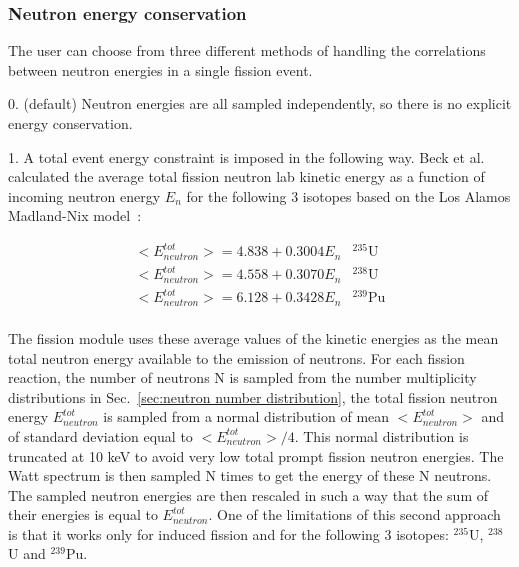 \subsubsection*{Neutron energy conservation}

The user can choose from three different methods of handling the
correlations between neutron energies in a single fission event.

\begin{list}{}
\item 0.  (default) Neutron 
energies are all sampled independently, so there is no explicit 
energy conservation.
\item 1.  A total event 
energy constraint is imposed in the following way. Beck et 
al.~\cite{Beck 2007} calculated the average total fission neutron 
lab kinetic energy as a function of incoming neutron energy $E_n$ 
for the following 3 isotopes based on the Los Alamos Madland-Nix 
model~\cite{Madland 1982}:


\begin{equation}
\begin{array}{ll}
<E^{tot}_{neutron}> = 4.838+0.3004E_n & ^{235}\mathrm{U}\\
<E^{tot}_{neutron}> = 4.558+0.3070E_n & ^{238}\mathrm{U}\\
<E^{tot}_{neutron}> = 6.128+0.3428E_n & ^{239}\mathrm{Pu}\\
\end{array}
\label{eq:Beck's expressions for the energy-dependent average outgoing prompt
fission neutron energy}
\end{equation}

The fission module uses these average values of the kinetic 
energies as the mean total neutron energy available to the 
emission of neutrons. For each fission reaction, the number 
of neutrons N is sampled from the number multiplicity 
distributions in Sec.~\ref{sec:neutron number 
distribution}, the total fission neutron energy 
$E^{tot}_{neutron}$ is sampled from a normal distribution 
of mean $<E^{tot}_{neutron}>$ and of standard deviation 
equal to $<E^{tot}_{neutron}>/4$. This normal distribution is 
truncated at 10 keV to avoid very low 
total prompt fission neutron energies. The Watt spectrum is then
sampled N times to get the energy of these N neutrons.
The sampled neutron energies are then rescaled in such a 
way that the sum of their energies is equal to 
$E^{tot}_{neutron}$. One of the limitations of this second 
approach is that it works only for induced fission and for 
the following 3 isotopes: $^{235}$U, $^{238}$U and $^{239}$Pu.


\end{list}
